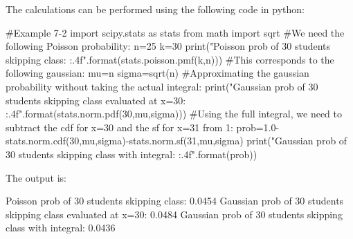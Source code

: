 \begin{example}
The calculations can be performed using the following code in python:
\begin{python}[caption = Comparison of probabilities from Poisson and normal distributions]
#Example 7-2
import scipy.stats as stats
from math import sqrt
#We need the following Poisson probability:
n=25
k=30
print("Poisson prob of 30 students skipping class: {:.4f}".format(stats.poisson.pmf(k,n)))
#This corresponds to the following gaussian:
mu=n
sigma=sqrt(n)
#Approximating the gaussian probability without taking the actual integral:
print("Gaussian prob of 30 students skipping class evaluated at x=30: {:.4f}".format(stats.norm.pdf(30,mu,sigma)))
#Using the full integral, we need to subtract the cdf for x=30 and the sf for x=31 from 1:
prob=1.0-stats.norm.cdf(30,mu,sigma)-stats.norm.sf(31,mu,sigma)
print("Gaussian prob of 30 students skipping class with integral: {:.4f}".format(prob))
\end{python}
The output is:
\begin{poutput}
Poisson prob of 30 students skipping class: 0.0454
Gaussian prob of 30 students skipping class evaluated at x=30: 0.0484
Gaussian prob of 30 students skipping class with integral: 0.0436
\end{poutput}

\end{example}


